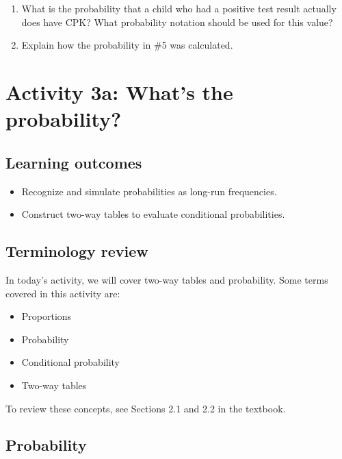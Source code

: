 \documentclass[
]{report}
\newcommand{\rgs}{\vspace{12pt}} %
\begin{document}
\begin{enumerate}
\def\labelenumi{\arabic{enumi}.}
\setcounter{enumi}{4}
\item
  What is the probability that a child who had a positive test result actually does have CPK? What probability notation should be used for this value?
  \rgs
\item
  Explain how the probability in \#5 was calculated.
\end{enumerate}

\newpage

\hypertarget{activity-3a-whats-the-probability}{%
\section{Activity 3a: What's the probability?}\label{activity-3a-whats-the-probability}}


\hypertarget{learning-outcomes-5}{%
\subsection{Learning outcomes}\label{learning-outcomes-5}}

\begin{itemize}
\item
  Recognize and simulate probabilities as long-run frequencies.
\item
  Construct two-way tables to evaluate conditional probabilities.
\end{itemize}

\hypertarget{terminology-review-5}{%
\subsection{Terminology review}\label{terminology-review-5}}

In today's activity, we will cover two-way tables and probability. Some terms covered in this activity are:

\begin{itemize}
\item
  Proportions
\item
  Probability
\item
  Conditional probability
\item
  Two-way tables
\end{itemize}

To review these concepts, see Sections 2.1 and 2.2 in the textbook.

\hypertarget{probability}{%
\subsection{Probability}\label{probability}}
\end{document}
